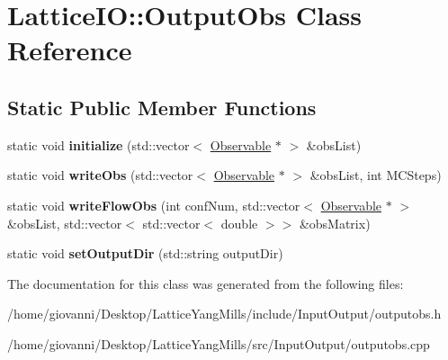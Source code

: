 \hypertarget{classLatticeIO_1_1OutputObs}{}\section{Lattice\+IO\+:\+:Output\+Obs Class Reference}
\label{classLatticeIO_1_1OutputObs}
\subsection*{Static Public Member Functions}
\begin{DoxyCompactItemize}
\item 
static void {\bfseries initialize} (std\+::vector$<$ \hyperlink{classObservable}{Observable} $\ast$ $>$ \&obs\+List)\hypertarget{classLatticeIO_1_1OutputObs_a472ae3b7d294a80a89642b6464ee8f7d}{}\label{classLatticeIO_1_1OutputObs_a472ae3b7d294a80a89642b6464ee8f7d}

\item 
static void {\bfseries write\+Obs} (std\+::vector$<$ \hyperlink{classObservable}{Observable} $\ast$ $>$ \&obs\+List, int M\+C\+Steps)\hypertarget{classLatticeIO_1_1OutputObs_a914832abc00b24dc989a3f0b066ff026}{}\label{classLatticeIO_1_1OutputObs_a914832abc00b24dc989a3f0b066ff026}

\item 
static void {\bfseries write\+Flow\+Obs} (int conf\+Num, std\+::vector$<$ \hyperlink{classObservable}{Observable} $\ast$ $>$ \&obs\+List, std\+::vector$<$ std\+::vector$<$ double $>$$>$ \&obs\+Matrix)\hypertarget{classLatticeIO_1_1OutputObs_a29d0eca3206d892a926ecf051c0ecfc3}{}\label{classLatticeIO_1_1OutputObs_a29d0eca3206d892a926ecf051c0ecfc3}

\item 
static void {\bfseries set\+Output\+Dir} (std\+::string output\+Dir)\hypertarget{classLatticeIO_1_1OutputObs_a3adffec5a9f218182a6d45cce7735362}{}\label{classLatticeIO_1_1OutputObs_a3adffec5a9f218182a6d45cce7735362}

\end{DoxyCompactItemize}


The documentation for this class was generated from the following files\+:\begin{DoxyCompactItemize}
\item 
/home/giovanni/\+Desktop/\+Lattice\+Yang\+Mills/include/\+Input\+Output/outputobs.\+h\item 
/home/giovanni/\+Desktop/\+Lattice\+Yang\+Mills/src/\+Input\+Output/outputobs.\+cpp\end{DoxyCompactItemize}
